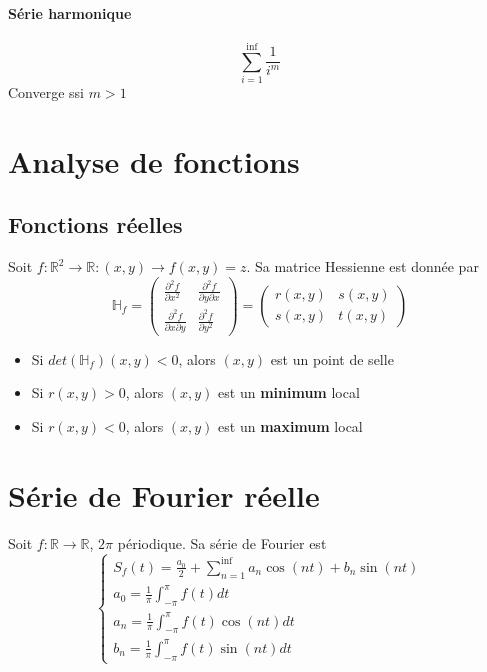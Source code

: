 \documentclass{article}
\begin{document}
\paragraph{Série harmonique}
\begin{equation}
    \sum_{i=1}^{\inf} \frac{1}{i^m}
\end{equation}
Converge ssi $ m > 1 $

\section{Analyse de fonctions}
\subsection{Fonctions réelles}
Soit $ f : \mathbb{R}^2 \rightarrow \mathbb{R} : (x, y) \rightarrow f(x, y) = z $. 
Sa matrice Hessienne est donnée par
\begin{equation}
    \mathbb{H}_f = 
    \begin{pmatrix}
       \frac{\partial^2f}{\partial x^2} & \frac{\partial^2f}{\partial y\partial x} \\
       \frac{\partial^2f}{\partial x\partial y} & \frac{\partial^2f}{\partial y^2} 
    \end{pmatrix}
    =
    \begin{pmatrix}
        r(x,y) & s(x,y) \\
        s(x,y) & t(x,y)
    \end{pmatrix}
\end{equation}

\begin{itemize}
    \item Si $det(\mathbb{H}_f)(x, y) < 0$, alors $(x, y)$ est un point de selle
    \item Si $r(x, y) > 0$, alors $(x, y)$ est un \textbf{minimum} local
    \item Si $r(x, y) < 0$, alors $(x, y)$ est un \textbf{maximum} local
\end{itemize}


\section{Série de Fourier réelle}
Soit $ f : \mathbb{R} \rightarrow \mathbb{R} $, $2\pi$ périodique. Sa série de Fourier est
\begin{equation}
    \begin{cases}
        S_f(t) = \frac{a_0}{2} + \sum_{n=1}^{\inf} a_n \cos(nt) + b_n \sin(nt)\\
        a_0 = \frac{1}{\pi}\int_{-\pi}^{\pi}f(t)dt\\
        a_n = \frac{1}{\pi}\int_{-\pi}^{\pi}f(t)\cos(nt)dt\\
        b_n = \frac{1}{\pi}\int_{-\pi}^{\pi}f(t)\sin(nt)dt
    \end{cases}
\end{equation}
\end{document}
